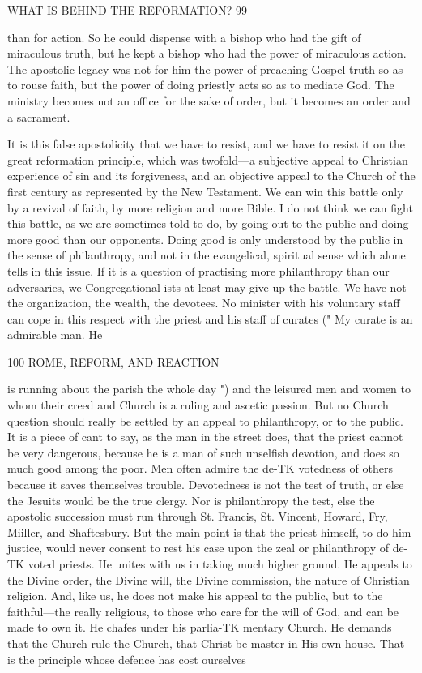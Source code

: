 \documentclass[12pt,a5paper,oneside]{book}
\begin{document}
WHAT IS BEHIND THE REFORMATION? 99 

than for action. So he could dispense with a bishop 
who had the gift of miraculous truth, but he kept 
a bishop who had the power of miraculous action. 
The apostolic legacy was not for him the power of 
preaching Gospel truth so as to rouse faith, but the 
power of doing priestly acts so as to mediate God. 
The ministry becomes not an office for the sake of 
order, but it becomes an order and a sacrament. 

It is this false apostolicity that we have to resist, 
and we have to resist it on the great reformation 
principle, which was twofold---a subjective appeal to 
Christian experience of sin and its forgiveness, and an 
objective appeal to the Church of the first century as 
represented by the New Testament. We can win 
this battle only by a revival of faith, by more religion 
and more Bible. I do not think we can fight this 
battle, as we are sometimes told to do, by going out to 
the public and doing more good than our opponents. 
Doing good is only understood by the public in the 
sense of philanthropy, and not in the evangelical, 
spiritual sense which alone tells in this issue. If it is 
a question of practising more philanthropy than our 
adversaries, we Congregational ists at least may give up 
the battle. We have not the organization, the wealth, 
the devotees. No minister with his voluntary staff 
can cope in this respect with the priest and his staff 
of curates (" My curate is an admirable man. He 



100 ROME, REFORM, AND REACTION 

is running about the parish the whole day ") 
and the leisured men and women to whom their 
creed and Church is a ruling and ascetic passion. 
But no Church question should really be settled by 
an appeal to philanthropy, or to the public. It is a 
piece of cant to say, as the man in the street does, 
that the priest cannot be very dangerous, because he 
is a man of such unselfish devotion, and does so much 
good among the poor. Men often admire the de-TK
votedness of others because it saves themselves trouble. 
Devotedness is not the test of truth, or else the Jesuits 
would be the true clergy. Nor is philanthropy the 
test, else the apostolic succession must run through 
St. Francis, St. Vincent, Howard, Fry, Miiller, 
and Shaftesbury. But the main point is that the 
priest himself, to do him justice, would never consent 
to rest his case upon the zeal or philanthropy of de-TK
voted priests. He unites with us in taking much 
higher ground. He appeals to the Divine order, the 
Divine will, the Divine commission, the nature of 
Christian religion. And, like us, he does not make 
his appeal to the public, but to the faithful---the really 
religious, to those who care for the will of God, and 
can be made to own it. He chafes under his parlia-TK
mentary Church. He demands that the Church rule 
the Church, that Christ be master in His own house. 
That is the principle whose defence has cost ourselves 
\end{document}
